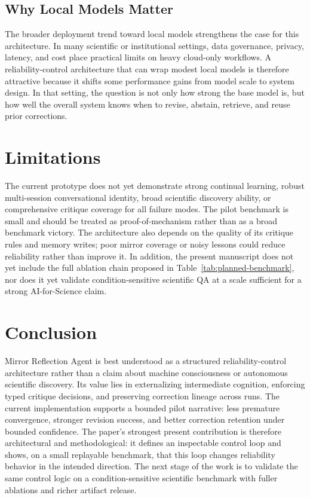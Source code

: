 \documentclass[12pt]{article}
\begin{document}
\subsection{Why Local Models Matter}

The broader deployment trend toward local models strengthens the case for this architecture. In many scientific or institutional settings, data governance, privacy, latency, and cost place practical limits on heavy cloud-only workflows. A reliability-control architecture that can wrap modest local models is therefore attractive because it shifts some performance gains from model scale to system design. In that setting, the question is not only how strong the base model is, but how well the overall system knows when to revise, abstain, retrieve, and reuse prior corrections.

\section{Limitations}

The current prototype does not yet demonstrate strong continual learning, robust multi-session conversational identity, broad scientific discovery ability, or comprehensive critique coverage for all failure modes. The pilot benchmark is small and should be treated as proof-of-mechanism rather than as a broad benchmark victory. The architecture also depends on the quality of its critique rules and memory writes; poor mirror coverage or noisy lessons could reduce reliability rather than improve it. In addition, the present manuscript does not yet include the full ablation chain proposed in Table~\ref{tab:planned-benchmark}, nor does it yet validate condition-sensitive scientific QA at a scale sufficient for a strong AI-for-Science claim.

\section{Conclusion}

Mirror Reflection Agent is best understood as a structured reliability-control architecture rather than a claim about machine consciousness or autonomous scientific discovery. Its value lies in externalizing intermediate cognition, enforcing typed critique decisions, and preserving correction lineage across runs. The current implementation supports a bounded pilot narrative: less premature convergence, stronger revision success, and better correction retention under bounded confidence. The paper's strongest present contribution is therefore architectural and methodological: it defines an inspectable control loop and shows, on a small replayable benchmark, that this loop changes reliability behavior in the intended direction. The next stage of the work is to validate the same control logic on a condition-sensitive scientific benchmark with fuller ablations and richer artifact release.
\end{document}
